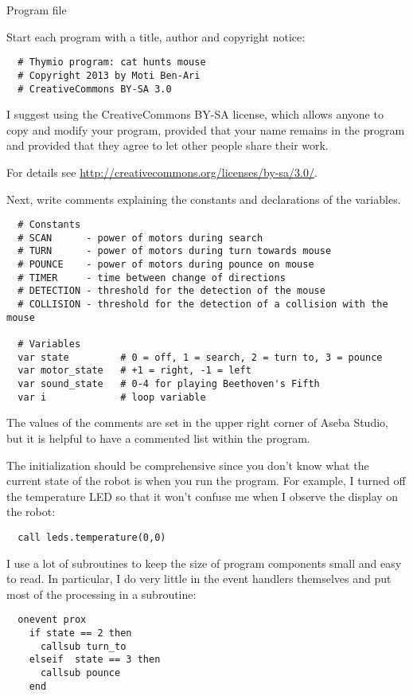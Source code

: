 
{\raggedleft \hfill Program file }

Start each program with a title, author and copyright notice:
\begin{verbatim}
  # Thymio program: cat hunts mouse
  # Copyright 2013 by Moti Ben-Ari
  # CreativeCommons BY-SA 3.0
\end{verbatim}

I suggest using the CreativeCommons BY-SA license, which allows anyone
to copy and modify your program, provided that your name remains in the
program and provided that they agree to let other people share their
work.

For details see \url{http://creativecommons.org/licenses/by-sa/3.0/}.

Next, write comments explaining the constants and declarations of the
variables.
\begin{verbatim}
  # Constants
  # SCAN      - power of motors during search
  # TURN      - power of motors during turn towards mouse
  # POUNCE    - power of motors during pounce on mouse
  # TIMER     - time between change of directions
  # DETECTION - threshold for the detection of the mouse
  # COLLISION - threshold for the detection of a collision with the mouse

  # Variables
  var state         # 0 = off, 1 = search, 2 = turn to, 3 = pounce
  var motor_state   # +1 = right, -1 = left
  var sound_state   # 0-4 for playing Beethoven's Fifth
  var i             # loop variable
\end{verbatim}

The values of the comments are set in the upper right corner of Aseba
Studio, but it is helpful to have a commented list within the program.

The initialization should be comprehensive since you don't know what the
current state of the robot is when you run the program. For example, I
turned off the temperature LED so that it won't confuse me when I
observe the display on the robot:

\begin{verbatim}
  call leds.temperature(0,0)
\end{verbatim}

I use a lot of subroutines to keep the size of program components small
and easy to read. In particular, I do very little in the event handlers
themselves and put most of the processing in a subroutine:
\begin{verbatim}
  onevent prox
    if state == 2 then
      callsub turn_to
    elseif  state == 3 then
      callsub pounce
    end
\end{verbatim}

